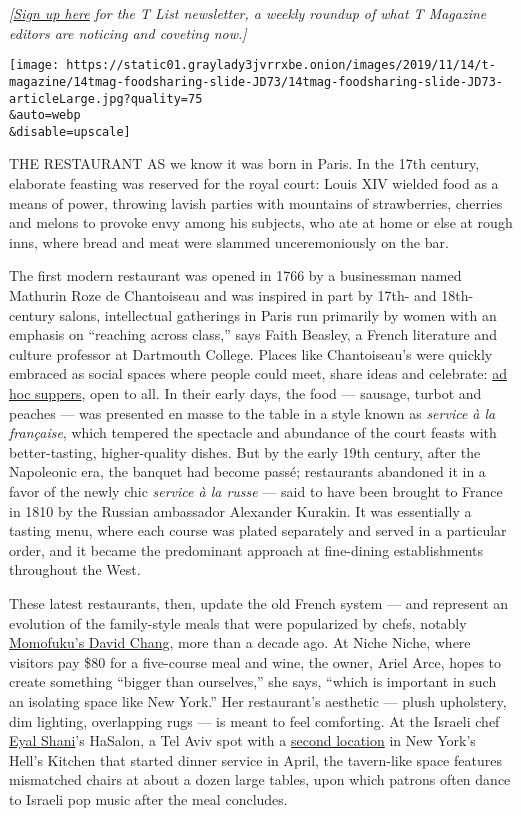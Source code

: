 \emph{{[}}\href{https://www.nytimes3xbfgragh.onion/newsletters/t-list?module=inline}{\emph{Sign
up here}} \emph{for the T List newsletter, a weekly roundup of what T
Magazine editors are noticing and coveting now.{]}}

\texttt{[image: https://static01.graylady3jvrrxbe.onion/images/2019/11/14/t-magazine/14tmag-foodsharing-slide-JD73/14tmag-foodsharing-slide-JD73-articleLarge.jpg?quality=75\\\&auto=webp\\\&disable=upscale]}

THE RESTAURANT AS we know it was born in Paris. In the 17th century,
elaborate feasting was reserved for the royal court: Louis XIV wielded
food as a means of power, throwing lavish parties with mountains of
strawberries, cherries and melons to provoke envy among his subjects,
who ate at home or else at rough inns, where bread and meat were slammed
unceremoniously on the bar.

The first modern restaurant was opened in 1766 by a businessman named
Mathurin Roze de Chantoiseau and was inspired in part by 17th- and
18th-century salons, intellectual gatherings in Paris run primarily by
women with an emphasis on ``reaching across class,'' says Faith Beasley,
a French literature and culture professor at Dartmouth College. Places
like Chantoiseau's were quickly embraced as social spaces where people
could meet, share ideas and celebrate:
\href{https://www.nytimes3xbfgragh.onion/2019/05/23/t-magazine/laila-gohar-dinner-party.html}{ad
hoc suppers}, open to all. In their early days, the food --- sausage,
turbot and peaches --- was presented en masse to the table in a style
known as \emph{service à la française}, which tempered the spectacle and
abundance of the court feasts with better-tasting, higher-quality
dishes. But by the early 19th century, after the Napoleonic era, the
banquet had become passé; restaurants abandoned it in a favor of the
newly chic \emph{service à la russe} --- said to have been brought to
France in 1810 by the Russian ambassador Alexander Kurakin. It was
essentially a tasting menu, where each course was plated separately and
served in a particular order, and it became the predominant approach at
fine-dining establishments throughout the West.

These latest restaurants, then, update the old French system --- and
represent an evolution of the family-style meals that were popularized
by chefs, notably
\href{https://www.nytimes3xbfgragh.onion/2017/11/10/t-magazine/asian-american-cuisine.html}{Momofuku's
David Chang}, more than a decade ago. At Niche Niche, where visitors pay
\$80 for a five-course meal and wine, the owner, Ariel Arce, hopes to
create something ``bigger than ourselves,'' she says, ``which is
important in such an isolating space like New York.'' Her restaurant's
aesthetic --- plush upholstery, dim lighting, overlapping rugs --- is
meant to feel comforting. At the Israeli chef
\href{https://www.nytimes3xbfgragh.onion/2018/01/08/dining/eyal-shani-miznon-restaurant-nyc.html}{Eyal
Shani}'s HaSalon, a Tel Aviv spot with a
\href{https://www.hasalonnyc.com/}{second location} in New York's Hell's
Kitchen that started dinner service in April, the tavern-like space
features mismatched chairs at about a dozen large tables, upon which
patrons often dance to Israeli pop music after the meal concludes.

